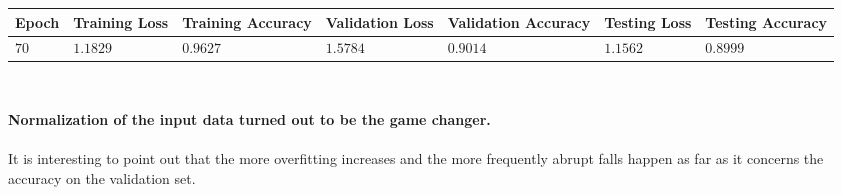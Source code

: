 \documentclass[11pt,a4paper]{article}
\begin{document}
\begin{center}
\hspace*{-0.8cm}
\begin{tabular}{|p{1.2cm}|p{1.8cm}|p{2cm}|p{2cm}|p{2cm}|p{2cm}|p{2cm}|}
\rowcolor{gray!50}
\hline
\textbf{Epoch} & \textbf{Training Loss} & \textbf{Training Accuracy} & \textbf{Validation Loss} & \textbf{Validation Accuracy} & \textbf{Testing Loss} & \textbf{Testing Accuracy}\\
\hline
$70$ & $1.1829$ & $0.9627$ & $1.5784$ & $0.9014$ & $1.1562$ & $0.8999$\\
\hline
\end{tabular}\\
\end{center}
\textbf{Normalization of the input data turned out to be the game changer.}\\
\\
It is interesting to point out that the more overfitting increases and the more frequently abrupt falls happen as far as it concerns the accuracy on the validation set.
\end{document}
